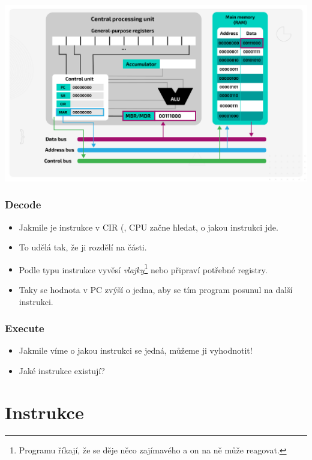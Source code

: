 \documentclass{beamer}
\begin{document}
\begin{frame}
	\includegraphics[scale=0.3]{fde.png}
\end{frame}


\begin{frame}
	\frametitle{\textbf{D}ecode}

	\begin{itemize}
		\item Jakmile je instrukce v CIR (, CPU začne hledat, o jakou instrukci jde.
		\item To udělá tak, že ji rozdělí na části.
		\item Podle typu instrukce vyvěsí \emph{vlajky}\footnote{Programu říkají, že se
			      děje něco zajímavého a on na ně může reagovat.} nebo připraví potřebné registry.
		\item Taky se hodnota v PC zvýší o jedna, aby se tím program posunul na
		      další instrukci.
	\end{itemize}
\end{frame}


\begin{frame}
	\frametitle{\textbf{E}xecute}
	\begin{itemize}
		\item Jakmile víme o jakou instrukci se jedná, můžeme ji vyhodnotit!
		\item Jaké instrukce existují?
	\end{itemize}
\end{frame}

\section{Instrukce}
\label{sec:instrukce}
\end{document}
